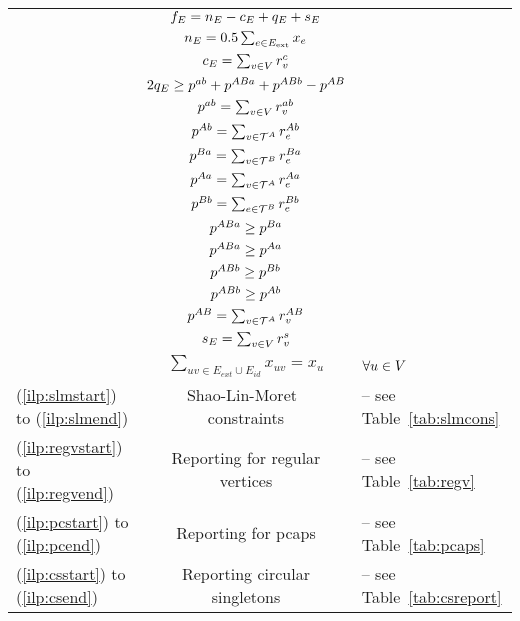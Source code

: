 \documentclass[runningheads]{llncs}
\begin{document}
\begin{algorithm}
\begin{constraints}
\begin{tabular}{lcl}
	\cns & $f_E = n_E - c_E + q_E + s_E$\\
	\cns & $n_E = 0.5 \sum_{e \in E_{\text{ext}}} x_{e}$\\
    \cns & $c_E = \sum_{v\in V} r^c_{v}$\\
    \cns & $2q_E \geq p^{a b}+ p^{ABa} + p^{ABb} - p^{A B} $\\
    \cns & $p^{a b} = \sum_{v \in V}r^{a b}_{v}$\\
    \cns & $p^{A b} = \sum_{v \in \mathcal{T}^A} r^{A b}_e$\\
    \cns & $p^{B a} = \sum_{v\in \mathcal{T}^B} r^{B a}_e$\\
    \cns & $p^{A a} = \sum_{v \in \mathcal{T}^A} r^{A a}_e$\\
    \cns & $p^{B b} = \sum_{e \in \mathcal{T}^B} r^{B b}_e$\\
    \cns & $p^{ABa} \geq p^{B a}$\\
    \cns & $p^{ABa} \geq p^{A a}$\\
    \cns & $p^{ABb} \geq p^{B b}$\\
    \cns & $p^{ABb} \geq p^{A b}$\\
    \cns & $p^{A B} = \sum_{v\in \mathcal{T}^A} r^{A B}_v$\\
    \cns & $s_E = \sum_{v\in V} r^{s}_{v}$ \\
     \cns & $\sum_{uv\in E_{ext} \cup E_{id} } x_{uv}= x_u$ & $\forall u\in V$  \\
    (\ref{ilp:slmstart}) to (\ref{ilp:slmend})& Shao-Lin-Moret~\cite{SHA-LIN-MOR-2015} constraints& -- see Table~\ref{tab:slmcons}\\
    (\ref{ilp:regvstart}) to (\ref{ilp:regvend})& Reporting for regular vertices& -- see Table~\ref{tab:regv}\\
    (\ref{ilp:pcstart}) to (\ref{ilp:pcend})& Reporting for \gls{pcaps}& -- see Table~\ref{tab:pcaps}\\
    (\ref{ilp:csstart}) to (\ref{ilp:csend})& Reporting circular singletons& --  see Table~\ref{tab:csreport}\\    
\end{tabular}

\end{constraints}
\end{algorithm}
\end{document}
